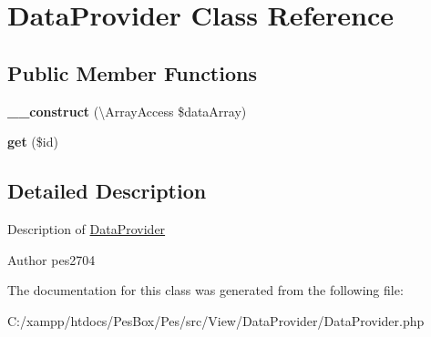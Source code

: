 \hypertarget{class_data_provider}{}\section{Data\+Provider Class Reference}
\label{class_data_provider}
\subsection*{Public Member Functions}
\begin{DoxyCompactItemize}
\item 
\mbox{\label{class_data_provider_a440369e062501dac8ed7ad434781d8d4}} 
{\bfseries \+\_\+\+\_\+construct} (\textbackslash{}Array\+Access \$data\+Array)
\item 
\mbox{\label{class_data_provider_a50e3bfb586b2f42932a6a93f3fbb0828}} 
{\bfseries get} (\$id)
\end{DoxyCompactItemize}


\subsection{Detailed Description}
Description of \mbox{\hyperlink{class_data_provider}{Data\+Provider}}

\begin{DoxyAuthor}{Author}
pes2704 
\end{DoxyAuthor}


The documentation for this class was generated from the following file\+:\begin{DoxyCompactItemize}
\item 
C\+:/xampp/htdocs/\+Pes\+Box/\+Pes/src/\+View/\+Data\+Provider/Data\+Provider.\+php\end{DoxyCompactItemize}
